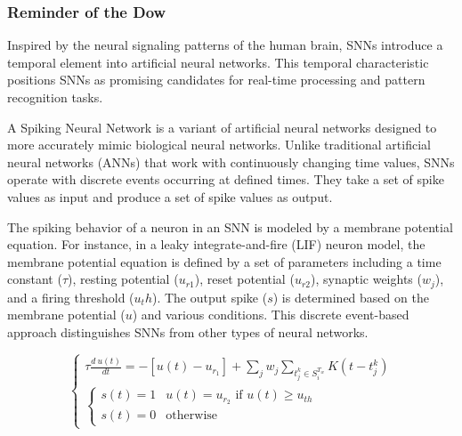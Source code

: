 \documentclass[11pt]{article}
\begin{document}
\subsubsection{Reminder of the Dow}

Inspired by the neural signaling patterns of the human brain, SNNs introduce a temporal element into artificial neural networks. This temporal characteristic positions SNNs as promising candidates for real-time processing and pattern recognition tasks.

A Spiking Neural Network is a variant of artificial neural networks designed to more accurately mimic biological neural networks. Unlike traditional artificial neural networks (ANNs) that work with continuously changing time values, SNNs operate with discrete events occurring at defined times. They take a set of spike values as input and produce a set of spike values as output.

The spiking behavior of a neuron in an SNN is modeled by a membrane potential equation. For instance, in a leaky integrate-and-fire (LIF) neuron model, the membrane potential equation is defined by a set of parameters including a time constant ($\tau$), resting potential ($u_{r1}$), reset potential ($u_{r2}$), synaptic weights ($w_j$), and a firing threshold ($u_th$). The output spike ($s$) is determined based on the membrane potential ($u$) and various conditions. This discrete event-based approach distinguishes SNNs from other types of neural networks.\cite{rething_comparison_ann_snn}

\begin{equation}
  \begin{cases}
    \tau \frac{d \: u(t)}{dt} = - [u(t) - u_{r_1}] + \sum_j w_j \sum_{t_j^k \in  S_i^{T_w}} K(t - t_j^k) \\
    \begin{cases}
      s(t) = 1 & u(t) = u_{r_2} \text{ if } u(t) \geq u_{th} \\
      s(t) = 0 & \text{otherwise}
    \end{cases}
  \end{cases}
  \label{eq:membrane_potential}
\end{equation}

\end{document}
